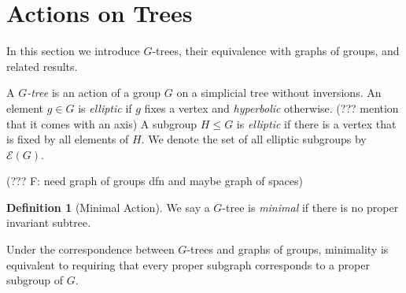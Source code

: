\documentclass[12pt,parskip=full]{report}
\theoremstyle{plain}
\theoremstyle{definition}
\newtheorem{dfn}[thm]{Definition}
\newtheorem{exa}[thm]{Example}
\begin{document}

















\section{Actions on Trees}

In this section we introduce \(G\)-trees, their equivalence with graphs of groups, and related results.

A \emph{\(G\)-tree} is an action of a group \(G\) on a simplicial tree without inversions. An element \(g\in G\) is \emph{elliptic} if \(g\) fixes a vertex and \emph{hyperbolic} otherwise. (??? mention that it comes with an axis) A subgroup \(H\leq G\) is \emph{elliptic} if there is a vertex that is fixed by all elements of \(H\). We denote the set of all elliptic subgroups by \(\mathcal{E}(G)\).

(??? F: need graph of groups dfn and maybe graph of spaces)

\begin{dfn}
    [Minimal Action]
    \label{defn:minimal}
    We say a $G$-tree is \emph{minimal} if there is no proper invariant subtree.
\end{dfn}

Under the correspondence between \(G\)-trees and graphs of groups, minimality is equivalent to requiring that every proper subgraph corresponds to a proper subgroup of \(G\).
\end{document}
